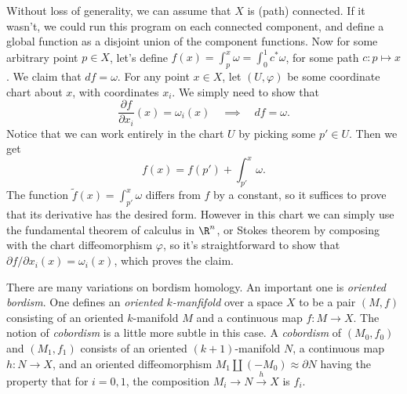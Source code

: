 \documentclass[11pt,letterpaper]{article}
\begin{document}
\begin{solution}
    \quad Without loss of generality, we can assume that $X$ is (path) connected. If it wasn't, we could run this program on each connected component, and define a global function as a disjoint union of the component functions. Now for some arbitrary point $p\in X$, let's define $f(x) = \int^x_p \omega = \int^1_0 c^*\omega$, for some path $c : p \mapsto x$. We claim that $df = \omega$. For any point $x\in X$, let $(U,\varphi)$ be some coordinate chart about $x$, with coordinates $x_i$. We simply need to show that
    \[
        \frac{\partial f}{\partial x_i}(x) = \omega_i(x) \quad \implies\quad  df = \omega.
    \] 
    Notice that we can work entirely in the chart $U$ by picking some $p'\in U$. Then we get 
    \[
        f(x) = f(p')+\int_{p'}^x \omega
    .\] 
    The function $\widetilde{f}(x)=\int_{p'}^x \omega$ differs from $f$ by a constant, so it suffices to prove that its derivative has the desired form. However in this chart we can simply use the fundamental theorem of calculus in $\R^n$, or Stokes theorem by composing with the chart diffeomorphism $\varphi$, so it's straightforward to show that $\partial f / \partial x_i(x)=\omega_i(x)$, which proves the claim.
\end{solution}

\begin{cproblem}{3}
There are many variations on bordism homology. An important one is
{\em oriented bordism}. One defines an {\em oriented $k$-manfifold}
over a space $X$ to be a pair $(M,f)$ consisting of an oriented $k$-manifold $M$ and a continuous map $f:M\to X$. The notion of {\em cobordism} is a little more subtle in this case. A {\em cobordism} of
$(M_{0},f_{0})$ and $(M_{1},f_{1})$ consists of an oriented $(k+1)$-manifold $N$, a continuous map $h:N\to X$, and an oriented diffeomorphism $M_{1}\amalg (-M_{0})\approx \partial N$ having the property that for $i=0,1$, the composition
$
M_{i}\to N\xrightarrow{h}{}X
$ is $f_{i}$. 
\end{cproblem}
\end{document}
